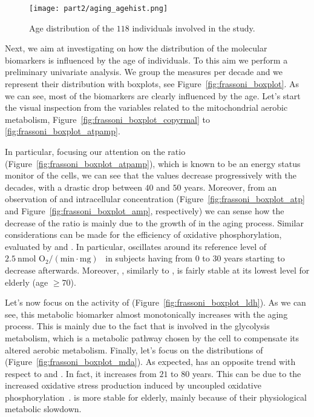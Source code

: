\begin{figure}[]
	\centering
	\texttt{[image: part2/aging\_agehist.png]}
	\caption{Age distribution of the $118$ individuals involved in the study.} \label{fig:frassoni_agehist}
\end{figure}

Next, we aim at investigating on how the distribution of the molecular biomarkers is influenced by the age of individuals. To this aim we perform a preliminary univariate analysis. We group the measures per decade and we represent their distribution with boxplots, see Figure~\ref{fig:frassoni_boxplot}.
As we can see, most of the biomarkers are clearly influenced by the age.
Let's start the visual inspection from the variables related to the mitochondrial aerobic metabolism, \ie Figure~\ref{fig:frassoni_boxplot_copyrmal} to \ref{fig:frassoni_boxplot_atpamp}.

In particular, focusing our attention on the \atpamp ratio (Figure~\ref{fig:frassoni_boxplot_atpamp}), which is known to be an energy status monitor of the cells, we can see that the values decrease progressively with the decades, with a drastic drop between $40$ and $50$ years. Moreover, from an observation of \atp and \amp intracellular concentration (Figure~\ref{fig:frassoni_boxplot_atp} and Figure~\ref{fig:frassoni_boxplot_amp}, respectively) we can sense how the decrease of the \atpamp ratio is mainly due to the growth of \amp in the aging process.
Similar considerations can be made for the efficiency of oxidative phosphorylation, evaluated by \popyrmal and \posucc. In particular, \popyrmal oscillates around its reference level of $2.5~\text{nmol~O}_2/(\text{min}\cdot\text{mg})$~\cite{hinkle2005p} in subjects having from $0$ to $30$ years starting to decrease afterwards. Moreover, \popyrmal, similarly to \atpamp, is fairly stable at its lowest level for elderly (age $\geq 70$).

Let's now focus on the activity of \LDH (Figure~\ref{fig:frassoni_boxplot_ldh}). As we can see, this metabolic biomarker almost monotonically increases with the aging process.
This is mainly due to the fact that \LDH is involved in the glycolysis metabolism, which is a metabolic pathway chosen by the cell to compensate its altered aerobic metabolism.
Finally, let's focus on the distributions of \mda (Figure~\ref{fig:frassoni_boxplot_mda}). As expected, \mda has an opposite trend with respect to \atpamp and \popyrmal. In fact, it increases from $21$ to $80$ years. This can be due to the increased oxidative stress production induced by uncoupled oxidative phosphorylation~\cite{dai2014mitochondrial}.
\mda is more stable for elderly, mainly because of their physiological metabolic slowdown.

